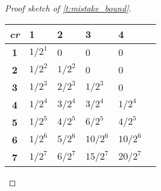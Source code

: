 \begin{proof}[Proof sketch of \autoref{t:mistake_bound}]
\begin{center}
  \begin{tabular}{|c |M{.77cm}|M{.77cm}|M{.77cm}|M{.77cm}|N}
    \hline
    {{\footnotesize \textit{\textbf{c}}}}{{\footnotesize \textit{\textbf{r}}}}
               & \textbf{1} & \textbf{2} & \textbf{3} & \textbf{4} &  \\ [13pt] \hline
    \textbf{1} & $1/2^1$    & 0          & 0          & 0          &  \\ [13pt] \hline
    \textbf{2} & $1/2^2$    & $1/2^2$    & 0          & 0          &  \\ [13pt] \hline
    \textbf{3} & $1/2^3$    & $2/2^3$    & $1/2^3$    & 0          &  \\ [13pt] \hline
    \textbf{4} & $1/2^4$    & $3/2^4$    & $3/2^4$    & $1/2^4$    &  \\ [13pt] \hline
    \textbf{5} & $1/2^5$    & $4/2^5$    & $6/2^5$    & $4/2^5$    &  \\ [13pt] \hline
    \textbf{6} & $1/2^6$    & $5/2^6$    & $10/2^6$   & $10/2^6$   &  \\ [13pt] \hline
    \textbf{7} & $1/2^7$    & $6/2^7$    & $15/2^7$   & $20/2^7$   &  \\ [13pt] \hline
  \end{tabular}
  \label{tab:mrc} 
\end{center}

\bigskip


\end{proof}
